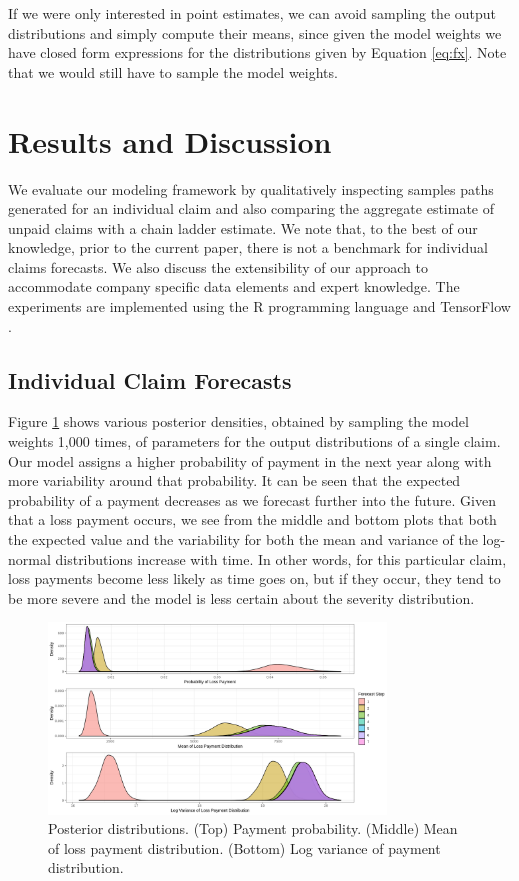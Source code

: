 \documentclass{article}
\begin{document}
If we were only interested in point estimates, we can avoid sampling the output distributions and simply compute their means, since given the model weights we have closed form expressions for the distributions given by Equation \ref{eq:fx}. Note that we would still have to sample the model weights.

\section {Results and Discussion}

We evaluate our modeling framework by qualitatively inspecting samples paths generated for an individual claim and also comparing the aggregate estimate of unpaid claims with a chain ladder estimate. We note that, to the best of our knowledge, prior to the current paper, there is not a benchmark for individual claims forecasts. We also discuss the extensibility of our approach to accommodate company specific data elements and expert knowledge. The experiments are implemented using the R programming language \cite{r2018} and TensorFlow \cite{tensorflow2015-whitepaper}.

\subsection{Individual Claim Forecasts}

Figure \ref{fig:prob_cash_flows} shows various posterior densities, obtained by sampling the model weights 1,000 times, of parameters for the output distributions of a single claim. Our model assigns a higher probability of payment in the next year along with more variability around that probability. It can be seen that the expected probability of a payment decreases as we forecast further into the future. Given that a loss payment occurs, we see from the middle and bottom plots that both the expected value and the variability for both the mean and variance of the log-normal distributions increase with time. In other words, for this particular claim, loss payments become less likely as time goes on, but if they occur, they tend to be more severe and the model is less certain about the severity distribution.

\begin{figure}
  \begin{center}
    \includegraphics[width=0.8\textwidth]{images/posteriors.png}
  \end{center}
  \caption{Posterior distributions. (Top) Payment probability. (Middle) Mean of loss payment distribution. (Bottom) Log variance of payment distribution.}
  \label{fig:prob_cash_flows}
\end{figure}
\end{document}

